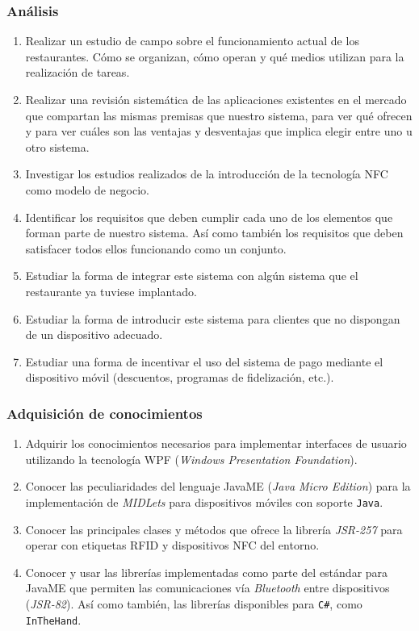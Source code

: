 \subsubsection{Análisis}
\begin{enumerate}
\item Realizar un estudio de campo sobre el funcionamiento actual de los
  restaurantes. Cómo se organizan, cómo operan y qué medios utilizan para la
  realización de tareas.
\item Realizar una revisión sistemática de las aplicaciones existentes en el
  mercado que compartan las mismas premisas que nuestro sistema, para ver qué
  ofrecen y para ver cuáles son las ventajas y desventajas que implica elegir
  entre uno u otro sistema.
\item Investigar los estudios realizados de la introducción de la tecnología
  \acs{NFC} como modelo de negocio.
\item Identificar los requisitos que deben cumplir cada uno de los elementos
  que forman parte de nuestro sistema. Así como también los requisitos que
  deben satisfacer todos ellos funcionando como un conjunto.
\item Estudiar la forma de integrar este sistema con algún sistema que el
  restaurante ya tuviese implantado.
\item Estudiar la forma de introducir este sistema para clientes que no
  dispongan de un dispositivo adecuado.
\item Estudiar una forma de incentivar el uso del sistema de pago mediante
  el dispositivo móvil (descuentos, programas de fidelización, etc.).
\end{enumerate}

\subsubsection{Adquisición de conocimientos}
\begin{enumerate}
\item Adquirir los conocimientos necesarios para implementar interfaces de
  usuario utilizando la tecnología \acs{WPF} (\emph{Windows Presentation
  Foundation}).
\item Conocer las peculiaridades del lenguaje \acs{JavaME} (\emph{Java Micro
  Edition}) para la implementación de \emph{MIDLets} para dispositivos móviles
  con soporte \texttt{Java}.
\item Conocer las principales clases y métodos que ofrece la librería
  \emph{\acs{JSR}-257} para operar con etiquetas \acs{RFID} y dispositivos
  \acs{NFC} del entorno.
\item Conocer y usar las librerías implementadas como parte del estándar para
  \acs{JavaME} que permiten las comunicaciones vía \emph{Bluetooth} entre 
  dispositivos (\emph{\acs{JSR}-82}). Así como también, las librerías
  disponibles para \texttt{C\#}, como \texttt{InTheHand}.
\end{enumerate}

